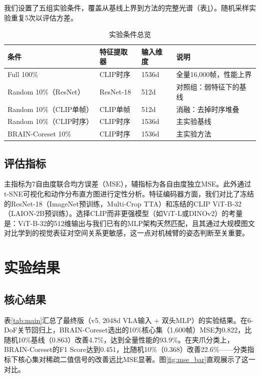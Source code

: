 \documentclass[11pt,a4paper,fontset=none]{ctexart}
\begin{document}
我们设置了五组实验条件，覆盖从基线上界到方法的完整光谱（表\ref{tab:conditions}）。随机采样实验重复5次以评估方差。

\begin{table}[H]
\centering\small
\caption{实验条件总览}
\label{tab:conditions}
\begin{tabular}{@{}llll@{}}
\toprule
\textbf{条件} & \textbf{特征提取器} & \textbf{输入维度} & \textbf{说明} \\
\midrule
Full 100\% & CLIP时序 & 1536d & 全量16,000帧，性能上界 \\
Random 10\%（ResNet） & ResNet-18 & 512d & 对照组：弱特征下的基线 \\
Random 10\%（CLIP单帧） & CLIP单帧 & 512d & 消融：去掉时序堆叠 \\
Random 10\%（CLIP时序） & CLIP时序 & 1536d & 主实验基线 \\
BRAIN-Coreset 10\% & CLIP时序 & 1536d & 主实验方法 \\
\bottomrule
\end{tabular}
\end{table}

\subsection{评估指标}

主指标为7自由度联合均方误差（MSE），辅指标为各自由度独立MSE。此外通过t-SNE可视化和动作分布直方图进行定性分析。特征编码器方面，我们对比了冻结的ResNet-18（ImageNet预训练，Multi-Crop TTA）和冻结的CLIP ViT-B-32（LAION-2B预训练）。选择CLIP而非更强模型（如ViT-L或DINOv2）的考量是：ViT-B-32的512维输出与我们已有的MLP架构天然匹配，且其通过大规模图文对比学到的视觉表征对空间关系更敏感，这一点对机械臂的姿态判断至关重要。

\section{实验结果}

\subsection{核心结果}

表\ref{tab:main}汇总了最终版（v5, 2048d VLA输入 + 双头MLP）的实验结果。在6-DoF关节回归上，BRAIN-Coreset选出的10\%核心集（1,600帧）MSE为0.822，比随机10\%基线（0.863）改善4.7\%，达到全量性能的93.9\%。在夹爪分类上，BRAIN-Coreset的F1 Score达到0.451，比随机10\%（0.368）改善22.6\%——分类指标下核心集对稀疏二值信号的改善远比MSE显著。图\ref{fig:mse_bar}直观展示了这一对比。
\end{document}
